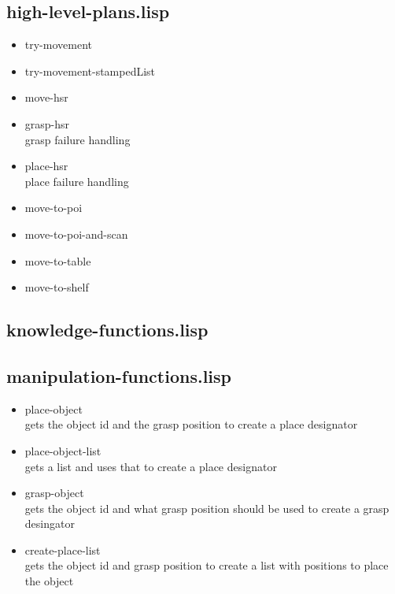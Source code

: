 \documentclass[main.tex]{subfiles}
\begin{document}
	    \subsection{high-level-plans.lisp}
	    \begin{itemize}
	    \item try-movement\\
		\item try-movement-stampedList\\
	    \item move-hsr\\
	    \item grasp-hsr\\
	    grasp failure handling 
	    \item place-hsr\\
	    place failure handling
	    \item move-to-poi\\
	    \item move-to-poi-and-scan\\
	    \item move-to-table\\
	    \item move-to-shelf\\
		\end{itemize}
	    \subsection{knowledge-functions.lisp}
	    \subsection{manipulation-functions.lisp}
	    \begin{itemize}
	    \item place-object\\
	    gets the object id and the grasp position to create a place designator  
		\item place-object-list\\
		gets a list and uses that to create a place designator 
	    \item grasp-object\\
	    gets the object id and what grasp position should be used to create a grasp desingator
	    \item create-place-list\\
	    gets the object id and grasp position to create a list with positions to place the object
		\end{itemize}
\end{document}

